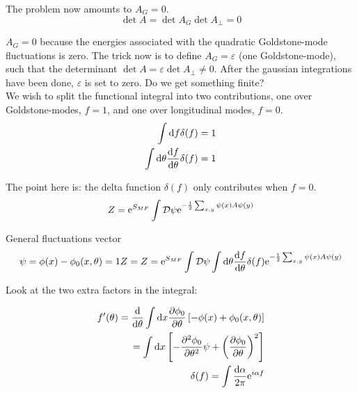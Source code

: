 The problem now amounts to $A_G = 0$. \\ 

\begin{equation*}
    \det A = \det A_G \det A_{\perp} = 0
\end{equation*}

$A_G = 0$ because the energies associated with the quadratic Goldstone-mode fluctuations is zero. The trick now is to define $A_G = \varepsilon$ (one Goldstone-mode), such that the determinant $\det A = \varepsilon \det A_{\perp} \neq 0$. After the gaussian integrations have been done, $\varepsilon$ is set to zero. Do we get something finite? \\ 

We wish to split the functional integral into two contributions, one over Goldstone-modes, $f = 1$, and one over longitudinal modes, $f = 0$. \\ 

\begin{align*}
    \int \dd f \delta (f) = 1 \\ 
    \int \dd \theta \dv{f}{\theta} \delta(f) = 1 \\
\end{align*}

The point here is: the delta function $\delta (f)$ only contributes when $f = 0$. \\ 

\begin{align*}
    Z = \mathrm{e}^{S_{MF}}\int \mathcal{D} \psi \mathrm{e}^{-\frac{1}{2}\sum_{x,y} \psi(x) A \psi(y)}
\end{align*}

General fluctuations vector \\ 

\begin{align*}
    \psi = \phi(x) - \phi_{0}(x,\theta) = 1
    Z = Z = \mathrm{e}^{S_{MF}}\int \mathcal{D} \psi \int \dd \theta \dv{f}{\theta} \delta(f) \mathrm{e}^{-\frac{1}{2}\sum_{x,y} \psi(x) A \psi(y)}
\end{align*}

Look at the two extra factors in the integral: 

\begin{align*}
    f'(\theta) = \dv{}{\theta} \int \dd x \pdv{\phi_0}{\theta}\left[-\phi(x) + \phi_0(x,\theta) \right] \\
    = \int \dd x \left[ -\pdv{^2\phi_0}{\theta^2} \psi + \left(\pdv{\phi_0}{\theta}\right)^2 \right] \\ 
    \delta(f) = \int \frac{\dd \alpha}{2\pi}\mathrm{e}^{i\alpha f}
\end{align*}

